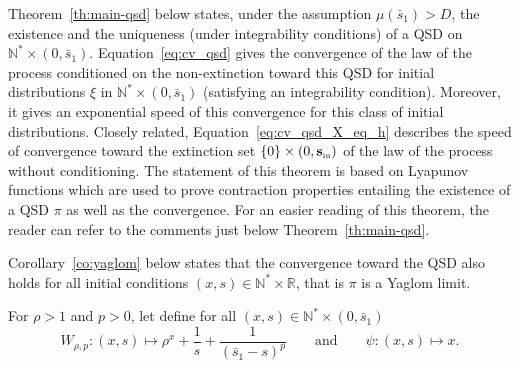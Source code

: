 \documentclass[AHL,Unicode,longabstracts,published]{cedram}
\newcommand{\RR}{\mathbb{R}}
\newcommand{\NN}{\mathbb{N}}
\newcommand{\Sin}{{\mathbf s}_{\textrm{\tiny\rm in}}}
\newcommand{\1}{\mathbf{1}}
\begin{document}
Theorem~\ref{th:main-qsd} below states, under the assumption $\mu(\bar s_1)>D$, the existence and the uniqueness (under integrability conditions) of a QSD on $\NN^*\times (0,\bar s_1)$. Equation~\eqref{eq:cv_qsd} gives the convergence of the law of the process conditioned on the non-extinction toward this QSD for initial distributions $\xi$ in $\NN^*\times (0,\bar s_1)$ (satisfying an integrability condition). Moreover, it gives an exponential speed of this convergence for this class of initial distributions. Closely related, Equation~\eqref{eq:cv_qsd_X_eq_h} describes the speed of convergence toward the extinction set $\{0\}\times (0,\Sin)$ of the law of the process without conditioning. The statement of this theorem is based on Lyapunov functions which are used to prove contraction properties entailing the existence of a QSD $\pi$ as well as the convergence. For an easier reading of this theorem, the reader can refer to the comments just below Theorem~\ref{th:main-qsd}.

Corollary~\ref{co:yaglom} below states that the convergence toward the QSD also holds for all initial conditions $(x,s) \in \NN^*\times \RR$, that is $\pi$ is a Yaglom limit.




For $\rho>1$ and $p>0$, let define for all $(x,s)\in \NN^*\times (0,\bar s_1)$
\[
W_{\rho,p}:(x,s) \mapsto \rho^x + \frac{1}{s}+ \frac{1}{(\bar s_1-s)^{p}}\qquad \text{and} \qquad \psi: (x,s) \mapsto x.
\]
\end{document}
